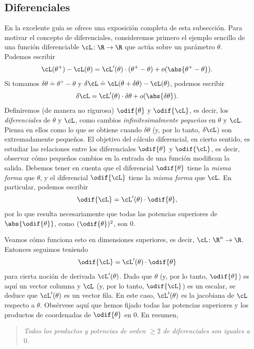 \documentclass[../../book-main_es.tex]{subfiles}
\begin{document}
\subsection{Diferenciales}

En la excelente guía
\cite{bright2025matrix} se ofrece una exposición completa de esta subsección. 
Para motivar el concepto de diferenciales, consideremos primero
el ejemplo sencillo de una función diferenciable \(\cL \colon
\R \to \R\) que actúa sobre un parámetro \(\theta\). Podemos escribir
\begin{equation}
    \cL(\theta^{+}) - \cL(\theta) =
    \cL^{\prime}(\theta)\cdot(\theta^{+} - \theta) +
    o(\abs{\theta^{+} - \theta}).
\end{equation}
Si tomamos \(\delta\theta \doteq \theta^{+} - \theta\) y
\(\delta\cL \doteq \cL(\theta + \delta\theta) - \cL(\theta)\), podemos escribir
\begin{equation}
    \delta\cL = \cL^{\prime}(\theta)\cdot\delta\theta + o(\abs{\delta\theta}).
\end{equation}
Definiremos (de manera no rigurosa) \(\odif{\theta}\) y \(\odif{\cL}\),
es decir, los \textit{diferenciales} de \(\theta\) y \(\cL\), como
cambios \textit{infinitesimalmente pequeños} en \(\theta\) y \(\cL\).
Piensa en ellos como lo que se obtiene cuando \(\delta\theta\) (y, por lo tanto,
\(\delta \cL\)) son extremadamente pequeños. El objetivo del cálculo diferencial,
en cierto sentido, es estudiar las relaciones entre los
diferenciales \(\odif{\theta}\) y \(\odif{\cL}\), es decir, observar
cómo pequeños cambios en la entrada de una función modifican la salida. Debemos
tener en cuenta que el diferencial \(\odif{\theta}\) tiene la
\textit{misma forma} que \(\theta\), y el diferencial
\(\odif{\cL}\) tiene la \textit{misma forma} que \(\cL\). En particular,
podemos escribir
\begin{equation}
    \odif{\cL} = \cL^{\prime}(\theta)\cdot\odif{\theta},
\end{equation}
por lo que resulta necesariamente que todas las potencias superiores de \(\abs{\odif{\theta}}\),
como \((\odif{\theta})^{2}\), son \(0\).

Veamos cómo funciona esto en dimensiones superiores, es decir, \(\cL \colon
\R^{n} \to \R\). Entonces seguimos teniendo
\begin{equation}
    \odif{\cL} = \cL^{\prime}(\theta)\cdot\odif{\theta}
\end{equation}
para cierta noción de derivada \(\cL^{\prime}(\theta)\). Dado que
\(\theta\) (y, por lo tanto, \(\odif{\theta}\)) es aquí un vector columna y
\(\cL\) (y, por lo tanto, \(\odif{\cL}\)) es un escalar, se deduce que
\(\cL^{\prime}(\theta)\) es un vector fila. En este caso,
\(\cL^{\prime}(\theta)\) es la jacobiana de \(\cL\)
respecto a \(\theta\). Obsérvese aquí que hemos fijado todas las potencias superiores y
los productos de coordenadas de \(\odif{\theta}\)  en \(0\). En resumen,
\begin{quote}
    \centering
    \textit{Todos los productos y potencias de orden \(\geq 2\) de diferenciales son
    iguales a \(0\).}
\end{quote}
\end{document}

